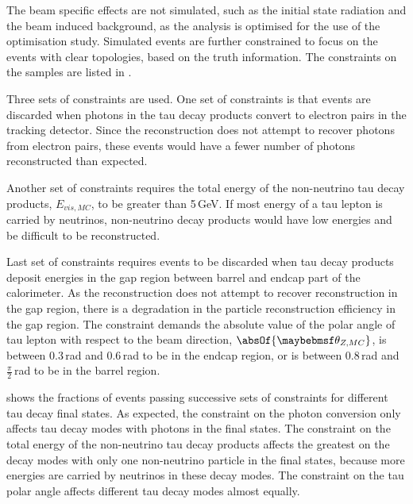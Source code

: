 The beam specific effects are not simulated, such as the initial state radiation and the beam induced background, as the analysis is optimised for the use of the \ECAL optimisation study. Simulated events are further constrained to focus on the events with clear topologies, based on the truth information. The constraints on the samples are listed in .

Three sets of constraints are used. One set of constraints is that events are discarded when photons in the tau decay products convert to electron pairs in the tracking detector. Since the reconstruction does not attempt to recover photons from electron pairs, these events would have a fewer number of photons reconstructed than expected.




Another set of constraints requires the total energy of the non-neutrino tau decay products, $E_{vis,MC}$, to be greater than 5\,GeV. If most energy of a tau lepton is carried by  neutrinos, non-neutrino decay products would have low energies and be difficult to be reconstructed.




Last set of constraints requires events to be discarded when tau decay products deposit energies in the gap region between barrel and  endcap part of the calorimeter. As the reconstruction   does not attempt to recover reconstruction in the gap region, there is a degradation in the particle reconstruction efficiency in the gap region. The constraint demands the absolute value of the polar angle of tau lepton with respect to the beam direction, $\absOf{\theta_{Z,MC}}$, is between 0.3\,rad and 0.6\,rad to be  in the endcap region, or is between 0.8\,rad and $\frac{\pi}{2}$\,rad to be  in the barrel region.

 shows the fractions of events passing successive sets of constraints  for different tau decay final states.  As expected, the constraint on the photon conversion only affects tau decay modes with  photons in the final states. The constraint on the total energy of the non-neutrino tau decay products affects the greatest on the  decay modes with only one non-neutrino particle in the final states, because more energies are carried by neutrinos in these decay modes. The constraint on the tau polar angle affects different tau decay modes almost equally.

